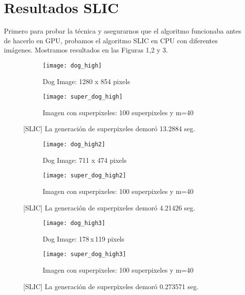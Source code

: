 \documentclass[11pt, oneside]{article}   	%
\begin{document}
\section{Resultados SLIC}

Primero para probar la t\'ecnica y asegurarnos que el algoritmo funcionaba antes de hacerlo en GPU, probamos el algoritmo SLIC en CPU con diferentes im\'agenes. Mostramos resultados en las Figuras 1,2 y 3.


\begin{figure}[H]
\label{fig1}
\centering
\begin{subfigure}[b]{0.49\textwidth}
\label{dog1sub1}
\caption{Dog Image: 1280 x 854 pixels}
\texttt{[image: dog\_high]}
\end{subfigure}
\begin{subfigure}[b]{0.49\textwidth}
\label{dog1sub2}
\caption{Imagen con superpixeles: 100 superpixeles y m=40}
\texttt{[image: super\_dog\_high]}
\end{subfigure}
\caption{[SLIC] La generaci\'on de superpixeles demor\'o 13.2884 seg.}
\end{figure}

\begin{figure}[H]
\label{fig2}
\centering
\begin{subfigure}[b]{0.49\textwidth}
\label{dog2sub1}
\caption{Dog Image: 711 x 474 pixels}
\texttt{[image: dog\_high2]}
\end{subfigure}
\begin{subfigure}[b]{0.49\textwidth}
\label{dog2sub2}
\caption{Imagen con superpixeles: 100 superpixeles y m=40}
\texttt{[image: super\_dog\_high2]}
\end{subfigure}
\caption{[SLIC] La generaci\'on de superpixeles demor\'o 4.21426 seg.}
\end{figure}


\begin{figure}[H]
\label{fig3}
\centering
\begin{subfigure}[b]{0.49\textwidth}
\label{dog3sub1}
\caption{Dog Image: 178 x 119 pixels}
\texttt{[image: dog\_high3]}
\end{subfigure}
\begin{subfigure}[b]{0.49\textwidth}
\label{dog3sub2}
\caption{Imagen con superpixeles: 100 superpixeles y m=40}
\texttt{[image: super\_dog\_high3]}
\end{subfigure}
\caption{[SLIC] La generaci\'on de superpixeles demor\'o 0.273571 seg.}
\end{figure}
\end{document}
